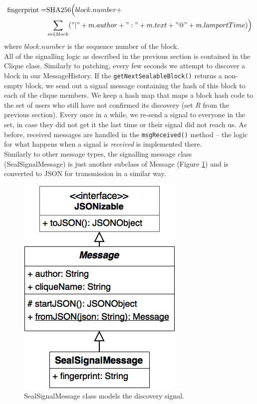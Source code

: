 \documentclass[a4paper, 12pt]{report}
\begin{document}
\begin{equation*}
    \begin{split}
    \text{fingerprint} = & \text{SHA256}\Big(block.number + \\
                        & \sum_{m \in block}("|" + m.author + ":" + m.text + "@" + m.lamportTime)\Big)
    \end{split}
\end{equation*}
where $block.number$ is the sequence number of the block. \\

All of the signalling logic as described in the previous section is contained in the Clique class. Similarly to patching, every few seconds we attempt to discover a block in our MessageHistory. If the \texttt{getNextSealableBlock()} returns a non-empty block, we send out a signal message containing the hash of this block to each of the clique members. We keep a hash map that maps a block hash code to the set of users who still have not confirmed its discovery (set $R$ from the previous section). Every once in a while, we re-send a signal to everyone in the set, in case they did not get it the last time or their signal did not reach us. As before, received messages are handled in the \texttt{msgReceived()} method -- the logic for what happens when a signal is \emph{received} is implemented there. \\

Similarly to other message types, the signalling message class (SealSignalMessage) is just another subclass of Message (Figure \ref{fig:seal_message}) and is converted to JSON for transmission in a similar way.

\begin{figure}[H]
    \captionsetup{width=0.80\textwidth}
    \centering
    \includegraphics[width=0.4\linewidth]{pics/seal_message.png}
    \caption{\label{fig:seal_message} SealSignalMessage class models the discovery signal.}
\end{figure}
\end{document}
